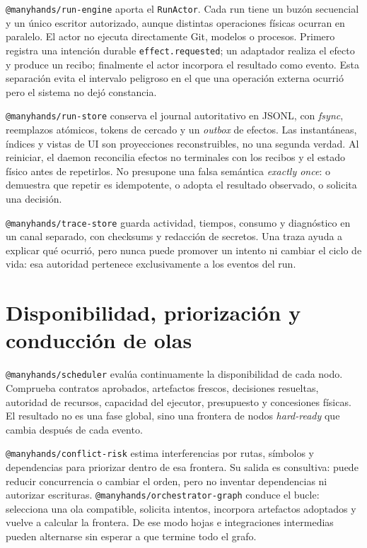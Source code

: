 \texttt{@manyhands/run-engine} aporta el \texttt{RunActor}. Cada run tiene un
buzón secuencial y un único escritor autorizado, aunque distintas operaciones
físicas ocurran en paralelo. El actor no ejecuta directamente Git, modelos o
procesos. Primero registra una intención durable \texttt{effect.requested}; un
adaptador realiza el efecto y produce un recibo; finalmente el actor incorpora
el resultado como evento. Esta separación evita el intervalo peligroso en el
que una operación externa ocurrió pero el sistema no dejó constancia.

\texttt{@manyhands/run-store} conserva el journal autoritativo en JSONL, con
\emph{fsync}, reemplazos atómicos, tokens de cercado y un \emph{outbox} de
efectos. Las instantáneas, índices y vistas de UI son proyecciones reconstruibles,
no una segunda verdad. Al reiniciar, el daemon reconcilia efectos no terminales
con los recibos y el estado físico antes de repetirlos. No presupone una falsa
semántica \emph{exactly once}: o demuestra que repetir es idempotente, o adopta
el resultado observado, o solicita una decisión.

\texttt{@manyhands/trace-store} guarda actividad, tiempos, consumo y diagnóstico
en un canal separado, con checksums y redacción de secretos. Una traza ayuda a
explicar qué ocurrió, pero nunca puede promover un intento ni cambiar el ciclo
de vida: esa autoridad pertenece exclusivamente a los eventos del run.

\section{Disponibilidad, priorización y conducción de olas}

\texttt{@manyhands/scheduler} evalúa continuamente la disponibilidad de cada
nodo. Comprueba contratos aprobados, artefactos frescos, decisiones resueltas,
autoridad de recursos, capacidad del ejecutor, presupuesto y concesiones
físicas. El resultado no es una fase global, sino una frontera de nodos
\emph{hard-ready} que cambia después de cada evento.

\texttt{@manyhands/conflict-risk} estima interferencias por rutas, símbolos y
dependencias para priorizar dentro de esa frontera. Su salida es consultiva:
puede reducir concurrencia o cambiar el orden, pero no inventar dependencias ni
autorizar escrituras. \texttt{@manyhands/orchestrator-graph} conduce el bucle:
selecciona una ola compatible, solicita intentos, incorpora artefactos adoptados
y vuelve a calcular la frontera. De ese modo hojas e integraciones intermedias
pueden alternarse sin esperar a que termine todo el grafo.

